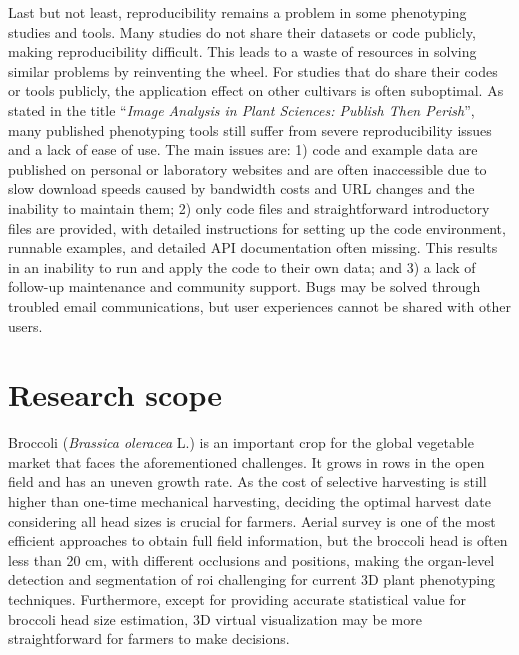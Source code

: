 Last but not least, reproducibility remains a problem in some phenotyping studies and tools. Many studies do not share their datasets or code publicly, making reproducibility difficult. This leads to a waste of resources in solving similar problems by reinventing the wheel. For studies that do share their codes or tools publicly, the application effect on other cultivars is often suboptimal. As \citet{lobet_image_2017} stated in the title ``\textit{Image Analysis in Plant Sciences: Publish Then Perish}'', many published phenotyping tools still suffer from severe reproducibility issues and a lack of ease of use. The main issues are: 1) code and example data are published on personal or laboratory websites and are often inaccessible due to slow download speeds caused by bandwidth costs and URL changes and the inability to maintain them; 2) only code files and straightforward introductory files are provided, with detailed instructions for setting up the code environment, runnable examples, and detailed API documentation often missing. This results in an inability to run and apply the code to their own data; and 3) a lack of follow-up maintenance and community support. Bugs may be solved through troubled email communications, but user experiences cannot be shared with other users.

\section{Research scope}

Broccoli (\textit{Brassica oleracea} L.) is an important crop for the global vegetable market that faces the aforementioned challenges. It grows in rows in the open field and has an uneven growth rate. As the cost of selective harvesting is still higher than one-time mechanical harvesting, deciding the optimal harvest date considering all head sizes is crucial for farmers. Aerial survey is one of the most efficient approaches to obtain full field information, but the broccoli head is often less than 20 cm, with different occlusions and positions, making the organ-level detection and segmentation of \gls{roi} challenging for current 3D plant phenotyping techniques. Furthermore, except for providing accurate statistical value for broccoli head size estimation, 3D virtual visualization may be more straightforward for farmers to make decisions.


